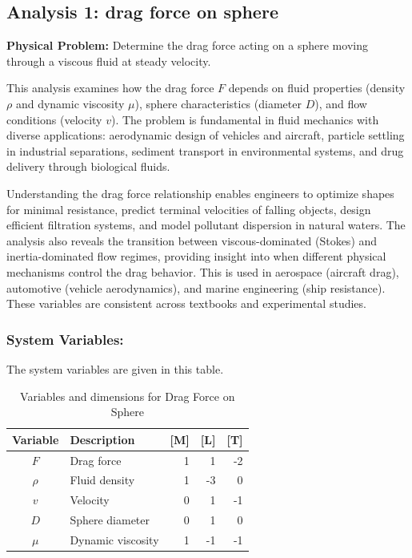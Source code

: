 %

\subsection{Analysis 1: drag force on sphere}
\label{sec:Drag_Force_on_Sphere}

\begin{problembox}
\textbf{Physical Problem:} Determine the drag force acting on a sphere moving through a viscous fluid at steady velocity.
\end{problembox}
\begin{codebox}
This analysis examines how the drag force $F$ depends on fluid properties (density $\rho$ and dynamic viscosity $\mu$), sphere characteristics (diameter $D$), and flow conditions (velocity $v$). The problem is fundamental in fluid mechanics with diverse applications: aerodynamic design of vehicles and aircraft, particle settling in industrial separations, sediment transport in environmental systems, and drug delivery through biological fluids.

Understanding the drag force relationship enables engineers to optimize shapes for minimal resistance, predict terminal velocities of falling objects, design efficient filtration systems, and model pollutant dispersion in natural waters. The analysis also reveals the transition between viscous-dominated (Stokes) and inertia-dominated flow regimes, providing insight into when different physical mechanisms control the drag behavior. This is used in aerospace (aircraft drag), automotive (vehicle aerodynamics), and marine engineering (ship resistance). These variables are consistent across textbooks and experimental studies.
\end{codebox}

\subsubsection*{System Variables: } The system variables are given in this table.

\begin{table}[htpb]
\centering
\begin{tabular}{|c|l|r|r|r|}
\hline
\textbf{Variable} & \textbf{Description} & \textbf{[M]} & \textbf{[L]} & \textbf{[T]} \\
\hline
$F$ & Drag force & 1 & 1 & -2 \\
$\rho$ & Fluid density & 1 & -3 & 0 \\
$v$ & Velocity & 0 & 1 & -1 \\
$D$ & Sphere diameter & 0 & 1 & 0 \\
$\mu$ & Dynamic viscosity & 1 & -1 & -1 \\
\hline
\end{tabular}
\caption{Variables and dimensions for Drag Force on Sphere}
\end{table}

